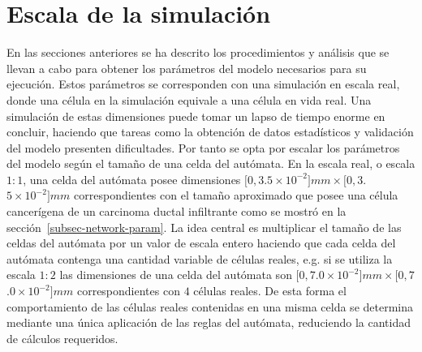 \section{Escala de la simulaci\'on}
\label{subsec-scale-param}
En las secciones anteriores se ha descrito los procedimientos y an\'alisis que se llevan a cabo para obtener los par\'ametros del modelo necesarios para su ejecuci\'on. Estos par\'ametros se corresponden con una simulaci\'on en escala real, donde una c\'elula en la simulaci\'on equivale a una c\'elula en vida real. Una simulaci\'on de estas dimensiones puede tomar un lapso de tiempo enorme en concluir, haciendo que tareas como la obtenci\'on de datos estad\'isticos y validaci\'on del modelo presenten dificultades. Por tanto se opta por escalar los par\'ametros del modelo seg\'un el tama\~no de una celda del aut\'omata. En la escala real, o escala $1:1$, una celda del aut\'omata posee dimensiones $[0,3$.$5 \times 10^{-2}]mm \times [0, 3$.$5 \times 10^{-2}]mm$ correspondientes con el tama\~no aproximado que posee una c\'elula cancer\'igena de un carcinoma ductal infiltrante como se mostr\'o en la secci\'on~\ref{subsec-network-param}. La idea central es multiplicar el tama\~no de las celdas del aut\'omata por un valor de escala entero haciendo que cada celda del aut\'omata contenga una cantidad variable de c\'elulas reales, e.g. si se utiliza la escala $1:2$ las dimensiones de una celda del aut\'omata son $[0,7$.$0 \times 10^{-2}]mm \times [0, 7$.$0 \times 10^{-2}]mm$ correspondientes con $4$ c\'elulas reales. De esta forma el comportamiento de las c\'elulas reales contenidas en una misma celda se determina mediante una \'unica aplicaci\'on de las reglas del aut\'omata, reduciendo la cantidad de c\'alculos requeridos. 

